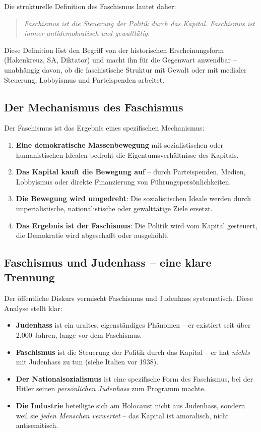 Die strukturelle Definition des Faschismus lautet daher:

\begin{quote}
\emph{Faschismus ist die Steuerung der Politik durch das Kapital. Faschismus ist immer antidemokratisch und gewalttätig.}
\end{quote}

Diese Definition löst den Begriff von der historischen Erscheinungsform (Hakenkreuz, SA, Diktator) und macht ihn für die Gegenwart anwendbar – unabhängig davon, ob die faschistische Struktur mit Gewalt oder mit medialer Steuerung, Lobbyismus und Parteispenden arbeitet.

\subsection{Der Mechanismus des Faschismus}

Der Faschismus ist das Ergebnis eines spezifischen Mechanismus:

\begin{enumerate}
    \item \textbf{Eine demokratische Massenbewegung} mit sozialistischen oder humanistischen Idealen bedroht die Eigentumsverhältnisse des Kapitals.
    \item \textbf{Das Kapital kauft die Bewegung auf} – durch Parteispenden, Medien, Lobbyismus oder direkte Finanzierung von Führungspersönlichkeiten.
    \item \textbf{Die Bewegung wird umgedreht}: Die sozialistischen Ideale werden durch imperialistische, nationalistische oder gewalttätige Ziele ersetzt.
    \item \textbf{Das Ergebnis ist der Faschismus}: Die Politik wird vom Kapital gesteuert, die Demokratie wird abgeschafft oder ausgehöhlt.
\end{enumerate}

\subsection{Faschismus und Judenhass – eine klare Trennung}

Der öffentliche Diskurs vermischt Faschismus und Judenhass systematisch. Diese Analyse stellt klar:

\begin{itemize}
    \item \textbf{Judenhass} ist ein uraltes, eigenständiges Phänomen – er existiert seit über 2.000 Jahren, lange vor dem Faschismus.
    \item \textbf{Faschismus} ist die Steuerung der Politik durch das Kapital – er hat \emph{nichts} mit Judenhass zu tun (siehe Italien vor 1938).
    \item \textbf{Der Nationalsozialismus} ist eine spezifische Form des Faschismus, bei der Hitler seinen \emph{persönlichen Judenhass} zum Programm machte.
    \item \textbf{Die Industrie} beteiligte sich am Holocaust nicht aus Judenhass, sondern weil sie \emph{jeden Menschen verwertet} – das Kapital ist amoralisch, nicht antisemitisch.
\end{itemize}

